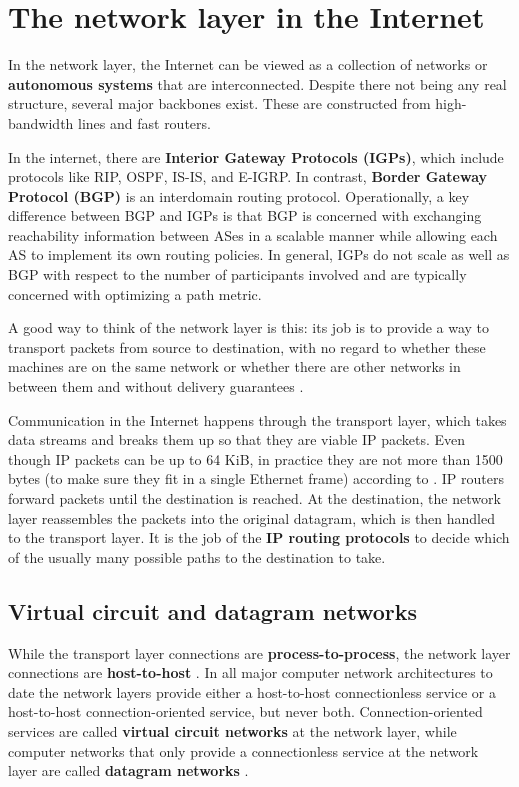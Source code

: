 \section{The network layer in the Internet}

In the network layer, the Internet can be viewed as a collection of networks or \textbf{autonomous systems} that are interconnected. Despite there not being any real structure, several major backbones exist. These are constructed from high-bandwidth lines and fast routers.

In the internet, there are \textbf{Interior Gateway Protocols (IGPs)}, which include protocols like RIP, OSPF, IS-IS, and E-IGRP.
In contrast, \textbf{Border Gateway Protocol (BGP)} is an interdomain routing protocol.
Operationally, a key difference between BGP and IGPs is that BGP is concerned with exchanging reachability information between ASes in a scalable manner while allowing each AS to implement its own routing policies.
In general, IGPs do not scale as well as BGP with respect to the number of participants involved and are typically concerned with optimizing a path metric.

A good way to think of the network layer is this: its job is to provide a way to transport packets from source to destination, with no regard to whether these machines are on the same network or whether there are other networks in between them and without delivery guarantees \cite{computer-networks-tanenbaum-2012}.

Communication in the Internet happens through the transport layer, which takes data streams and breaks them up so that they are viable IP packets. Even though IP packets can be up to 64 KiB, in practice they are not more than 1500 bytes (to make sure they fit in a single Ethernet frame) according to \cite{computer-networks-tanenbaum-2012}.
IP routers forward packets until the destination is reached. At the destination, the network layer reassembles the packets into the original datagram, which is then handled to the transport layer.
It is the job of the \textbf{IP routing protocols} to decide which of the usually many possible paths to the destination to take.

\subsection{Virtual circuit and datagram networks}

While the transport layer connections are \textbf{process-to-process}, the network layer connections are \textbf{host-to-host} \cite[p.~313]{computer-networking-kurose-2012}.
In all major computer network architectures to date the network layers provide either a host-to-host connectionless service or a host-to-host connection-oriented service, but never both. Connection-oriented services are called \textbf{virtual circuit networks} at the network layer, while computer networks that only provide a connectionless service at the network layer are called \textbf{datagram networks} \cite[p.~313]{computer-networking-kurose-2012}.

